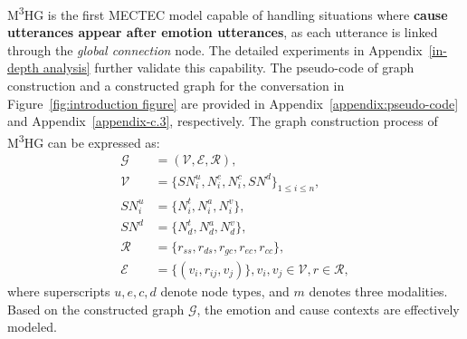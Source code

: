 \documentclass[11pt]{article}
\begin{document}
M\textsuperscript{3}HG is the first MECTEC model capable of handling situations where \textbf{cause utterances appear after emotion utterances}, as each utterance is linked through the \textit{global connection} node.
The detailed experiments in Appendix~\ref{in-depth analysis} further validate this capability.
The pseudo-code of graph construction and a constructed graph for the conversation in Figure~\ref{fig:introduction figure} are provided in Appendix~\ref{appendix:pseudo-code} and Appendix~\ref{appendix-c.3}, respectively.
The graph construction process of M\textsuperscript{3}HG can be expressed as:
\begin{equation}
    \begin{aligned}
    \mathcal{G} &= (\mathcal{V}, \mathcal{E}, \mathcal{R}), \\
    \mathcal{V} &= \{ SN_i^u, N_i^e, N_i^c, SN^d \}_{1\leq i\leq n}, \\
    SN_i^u &= \{ N_i^t, N_i^a, N_i^v \},\\
    SN^d &= \{ N_d^t, N_d^a, N_d^v\}, \ \\
    \mathcal{R} &= \{ r_{ss}, r_{ds}, r_{gc}, r_{ec}, r_{cc} \}, \\
    \mathcal{E} &= \{(v_i, r_{ij}, v_j)\}, v_i, v_j \in \mathcal{V}, r \in \mathcal{R},
    \end{aligned}
\end{equation}
where superscripts $u,e,c,d$ denote node types,  and $m$ denotes three modalities.
Based on the constructed graph $\mathcal{G}$, the emotion and cause contexts are effectively modeled.
\end{document}
